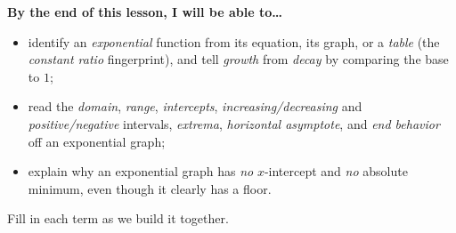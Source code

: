 \documentclass[10pt]{article}
\begin{document}
\namedateperiod

\vspace{0.08in}

\begin{objectivebox}
\textbf{By the end of this lesson, I will be able to\dots}
\begin{itemize}\setlength{\itemsep}{2pt}
  \item identify an \emph{exponential} function from its equation, its graph, or a \emph{table} (the \emph{constant ratio} fingerprint), and tell \emph{growth} from \emph{decay} by comparing the base to $1$;
  \item read the \emph{domain}, \emph{range}, \emph{intercepts}, \emph{increasing/decreasing} and \emph{positive/negative} intervals, \emph{extrema}, \emph{horizontal asymptote}, and \emph{end behavior} off an exponential graph;
  \item explain why an exponential graph has \emph{no} $x$-intercept and \emph{no} absolute minimum, even though it clearly has a floor.
\end{itemize}
\end{objectivebox}

\vspace{0.05in}

\begin{vocabbox}
\small
Fill in each term as we build it together.
\par\vspace{2pt}   %
\end{vocabbox}
\end{document}
